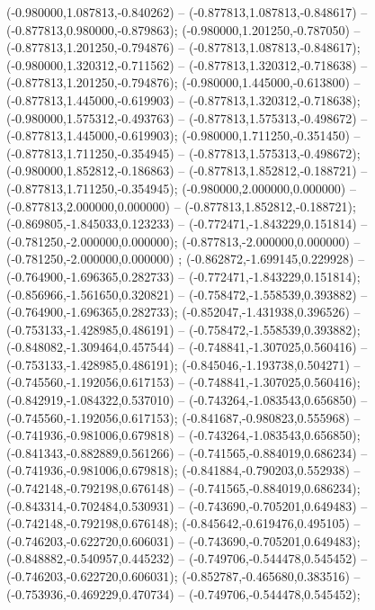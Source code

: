  (-0.980000,1.087813,-0.840262) -- (-0.877813,1.087813,-0.848617) -- (-0.877813,0.980000,-0.879863);
 (-0.980000,1.201250,-0.787050) -- (-0.877813,1.201250,-0.794876) -- (-0.877813,1.087813,-0.848617);
 (-0.980000,1.320312,-0.711562) -- (-0.877813,1.320312,-0.718638) -- (-0.877813,1.201250,-0.794876);
 (-0.980000,1.445000,-0.613800) -- (-0.877813,1.445000,-0.619903) -- (-0.877813,1.320312,-0.718638);
 (-0.980000,1.575312,-0.493763) -- (-0.877813,1.575313,-0.498672) -- (-0.877813,1.445000,-0.619903);
 (-0.980000,1.711250,-0.351450) -- (-0.877813,1.711250,-0.354945) -- (-0.877813,1.575313,-0.498672);
 (-0.980000,1.852812,-0.186863) -- (-0.877813,1.852812,-0.188721) -- (-0.877813,1.711250,-0.354945);
 (-0.980000,2.000000,0.000000) -- (-0.877813,2.000000,0.000000) -- (-0.877813,1.852812,-0.188721);
 (-0.869805,-1.845033,0.123233) -- (-0.772471,-1.843229,0.151814) -- (-0.781250,-2.000000,0.000000);
 (-0.877813,-2.000000,0.000000) -- (-0.781250,-2.000000,0.000000) ;
 (-0.862872,-1.699145,0.229928) -- (-0.764900,-1.696365,0.282733) -- (-0.772471,-1.843229,0.151814);
 (-0.856966,-1.561650,0.320821) -- (-0.758472,-1.558539,0.393882) -- (-0.764900,-1.696365,0.282733);
 (-0.852047,-1.431938,0.396526) -- (-0.753133,-1.428985,0.486191) -- (-0.758472,-1.558539,0.393882);
 (-0.848082,-1.309464,0.457544) -- (-0.748841,-1.307025,0.560416) -- (-0.753133,-1.428985,0.486191);
 (-0.845046,-1.193738,0.504271) -- (-0.745560,-1.192056,0.617153) -- (-0.748841,-1.307025,0.560416);
 (-0.842919,-1.084322,0.537010) -- (-0.743264,-1.083543,0.656850) -- (-0.745560,-1.192056,0.617153);
 (-0.841687,-0.980823,0.555968) -- (-0.741936,-0.981006,0.679818) -- (-0.743264,-1.083543,0.656850);
 (-0.841343,-0.882889,0.561266) -- (-0.741565,-0.884019,0.686234) -- (-0.741936,-0.981006,0.679818);
 (-0.841884,-0.790203,0.552938) -- (-0.742148,-0.792198,0.676148) -- (-0.741565,-0.884019,0.686234);
 (-0.843314,-0.702484,0.530931) -- (-0.743690,-0.705201,0.649483) -- (-0.742148,-0.792198,0.676148);
 (-0.845642,-0.619476,0.495105) -- (-0.746203,-0.622720,0.606031) -- (-0.743690,-0.705201,0.649483);
 (-0.848882,-0.540957,0.445232) -- (-0.749706,-0.544478,0.545452) -- (-0.746203,-0.622720,0.606031);
 (-0.852787,-0.465680,0.383516) -- (-0.753936,-0.469229,0.470734) -- (-0.749706,-0.544478,0.545452);
